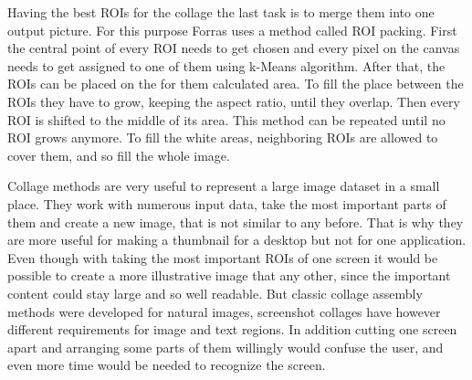\documentclass[draft,final]{vutinfth} %
\begin{document}
Having the best ROIs for the collage the last task is to merge them into one output picture.
For this purpose Forras uses a method called ROI packing.
First the central point of every ROI needs to get chosen and every pixel on the canvas needs to get assigned to one of them using k-Means algorithm.
After that, the ROIs can be placed on the  for them calculated  area.
To fill the place between the ROIs they have to grow, keeping the aspect ratio, until they overlap. 
Then every ROI is shifted to the middle of its area.
This method can be repeated until no ROI grows anymore.
To fill the white areas, neighboring ROIs are allowed to cover them, and so fill the whole image.\par
Collage methods are very useful to represent a large image dataset in a small place.
They work with numerous input data, take the most important parts of them and create a new image, that is not similar to any before.
That is why they are more useful for making a thumbnail for a desktop but not for one application.
Even though with taking the most important ROIs of one screen it would be possible to create a  more illustrative image that any other, since the important content could stay large and so well readable.
But classic collage assembly methods were developed for natural images, screenshot collages have however different requirements for image and text regions.
In addition cutting one screen apart and arranging some parts of them willingly would confuse the user, and even more time would be needed to recognize the screen.
\end{document}
